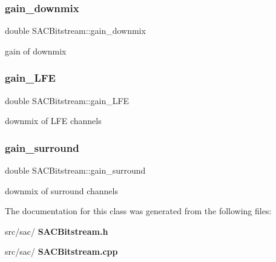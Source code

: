 \subsubsection{gain\+\_\+downmix}
{\footnotesize\ttfamily double S\+A\+C\+Bitstream\+::gain\+\_\+downmix}

gain of downmix \mbox{\label{class_s_a_c_bitstream_a4edc51fec93b93461156d8fa376e0116}} 
\subsubsection{gain\+\_\+\+L\+FE}
{\footnotesize\ttfamily double S\+A\+C\+Bitstream\+::gain\+\_\+\+L\+FE}

downmix of L\+FE channels \mbox{\label{class_s_a_c_bitstream_acf9019de0f79c54aae0ffa29a57c3194}} 
\subsubsection{gain\+\_\+surround}
{\footnotesize\ttfamily double S\+A\+C\+Bitstream\+::gain\+\_\+surround}

downmix of surround channels 

The documentation for this class was generated from the following files\+:\begin{DoxyCompactItemize}
\item 
src/sac/\textbf{ S\+A\+C\+Bitstream.\+h}\item 
src/sac/\textbf{ S\+A\+C\+Bitstream.\+cpp}\end{DoxyCompactItemize}
